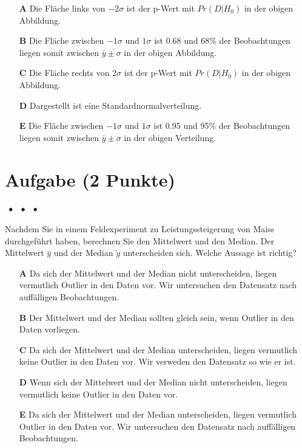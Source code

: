 \documentclass[a4paper, 9pt]{scrartcl}\usepackage[]{graphicx}\usepackage[]{xcolor}
\begin{document}
\begin{enumerate}
\item [\textbf{A} \msquare] Die Fläche links von $-2\sigma$ ist der p-Wert mit $Pr(D|H_0)$ in der obigen Abbildung.
\item [\textbf{B} \msquare] Die Fläche zwischen $-1\sigma$ und $1\sigma$ ist 0.68 und 68\% der Beobachtungen liegen somit zwischen $\bar{y}\pm\sigma$ in der obigen Abbildung.
\item [\textbf{C} \msquare] Die Fläche rechts von $2\sigma$ ist der p-Wert mit $Pr(D|H_0)$ in der obigen Abbildung.
\item [\textbf{D} \msquare] Dargestellt ist eine Standardnormalverteilung.
\item [\textbf{E} \msquare] Die Fläche zwischen $-1\sigma$ und $1\sigma$ ist 0.95 und 95\% der Beobachtungen liegen somit zwischen $\bar{y}\pm\sigma$ in der obigen Verteilung.
\end{enumerate}

\section{Aufgabe \hfill (2 Punkte)}

\ifcollection
\begin{flushright}
\tiny\vspace{-2Ex}
\textbf{\examinhaltstart}
\exammodulestat $\;\bullet$
\exammodulestatbbv $\;\bullet$
\exammodulestatversuch $\;\bullet$
\exammodulebiostat
\vspace{-1Ex}
\end{flushright}
\fi




Nachdem Sie in einem Feldexperiment zu Leistungssteigerung von Maiss durchgeführt haben, berechnen Sie den Mittelwert und den Median. Der Mittelwert $\bar{y}$ und der Median $\tilde{y}$ unterscheiden sich. Welche Aussage ist richtig?



\begin{enumerate}
\item [\textbf{A} \msquare] Da sich der Mittelwert und der Median nicht unterscheiden, liegen vermutlich Outlier in den Daten vor. Wir untersuchen den Datensatz nach auffälligen Beobachtungen.
\item [\textbf{B} \msquare] Der Mittelwert und der Median sollten gleich sein, wenn Outlier in den Daten vorliegen. 
\item [\textbf{C} \msquare] Da sich der Mittelwert und der Median unterscheiden, liegen vermutlich keine Outlier in den Daten vor. Wir verweden den Datensatz so wie er ist.
\item [\textbf{D} \msquare] Wenn sich der Mittelwert und der Median nicht unterscheiden, liegen vermutlich keine Outlier in den Daten vor.
\item [\textbf{E} \msquare] Da sich der Mittelwert und der Median unterscheiden, liegen vermutlich Outlier in den Daten vor. Wir untersuchen den Datensatz nach auffälligen Beobachtungen.
\end{enumerate} 
\end{document}
